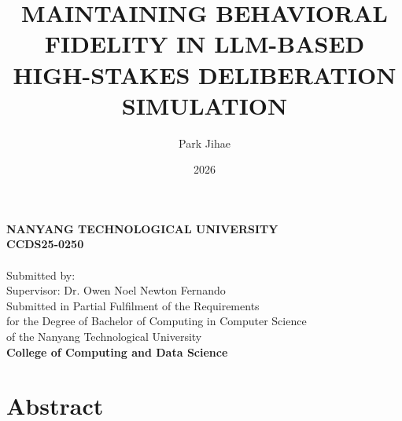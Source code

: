 \documentclass[12pt, a4paper]{report}
\title{\uppercase{Maintaining Behavioral Fidelity in LLM-Based High-Stakes Deliberation Simulation}}
\author{Park Jihae}
\date{2026}
\newcommand\fypcode{CCDS25-0250}
\newcommand\degree{Bachelor of Computing in Computer Science}
\begin{document}
\makeatletter
\begin{titlepage}
\begin{center}

\uppercase{\textbf{\large{Nanyang Technological University}}}
\\[3cm]

\uppercase{\textbf{\fypcode}}
\\[0.5cm]

\uppercase{\textbf{\large{\@title}}}
\\[3cm]

Submitted by: \@author
\\[1cm]

Supervisor: Dr. Owen Noel Newton Fernando
\\[3cm]


Submitted in Partial Fulfilment of the Requirements\\
for the Degree of \degree\\
of the Nanyang Technological University
\\[2cm]

\textbf{College of Computing and Data Science}
\\[1.5cm]

\@date

\end{center}
\end{titlepage}
\makeatother

\setcounter{page}{1}

\chapter*{Abstract}
\end{document}
